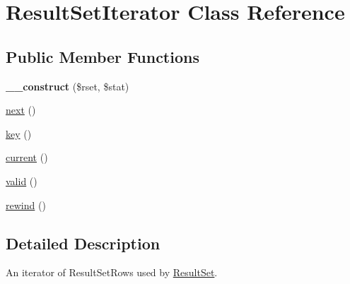 \hypertarget{classResultSetIterator}{
\section{ResultSetIterator Class Reference}
\label{classResultSetIterator}
}
\subsection*{Public Member Functions}
\begin{DoxyCompactItemize}
\item 
\hypertarget{classResultSetIterator_acb0cc487f8d0bc52b164335bd7691f1e}{
{\bfseries \_\-\_\-construct} (\$rset, \$stat)}
\label{classResultSetIterator_acb0cc487f8d0bc52b164335bd7691f1e}

\item 
\hyperlink{classResultSetIterator_a5ed2709915f0e61d008f62ac99f6d7d7}{next} ()
\item 
\hyperlink{classResultSetIterator_a4d31e6ec548912c7f725b9fa71df8b02}{key} ()
\item 
\hyperlink{classResultSetIterator_a7eb652f50d47244c2f2090ad77cba6c3}{current} ()
\item 
\hyperlink{classResultSetIterator_a1ddc5f382d17bc1fcc2d9740fa2acf2c}{valid} ()
\item 
\hyperlink{classResultSetIterator_aa93d51d5866155c4eacea03f8856c54c}{rewind} ()
\end{DoxyCompactItemize}


\subsection{Detailed Description}
An iterator of ResultSetRows used by \hyperlink{classResultSet}{ResultSet}. 

